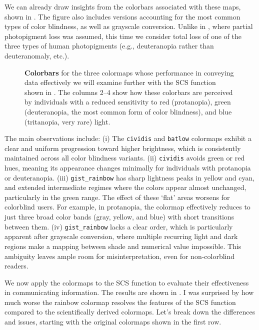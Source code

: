 We can already draw insights from the colorbars associated with these maps, shown in . The figure also includes versions accounting for the most common types of color blindness, as well as grayscale conversion. Unlike in , where partial photopigment loss was assumed, this time we consider total loss of one of the three types of human photopigments (e.g., deuteranopia rather than deuteranomaly, etc.).

\begin{figure}
	\centering
	
	\caption{\textbf{Colorbars} for the three colormaps whose performance in conveying data effectively we will examine further with the SCS function shown in . The columns 2--4 show how these colorbars are perceived by individuals with a reduced sensitivity to red (protanopia), green (deuteranopia, the most common form of color blindness), and blue (tritanopia, very rare) light.}
	\label{fig:colorbars}
\end{figure}

The main observations include: (i) The \verb|cividis| and \verb|batlow| colormaps exhibit a clear and uniform progression toward higher brightness, which is consistently maintained across all color blindness variants. (ii) \verb|cividis| avoids green or red hues, meaning its appearance changes minimally for individuals with protanopia or deuteranopia. (iii) \verb|gist_rainbow| has sharp lightness peaks in yellow and cyan, and extended intermediate regimes where the colors appear almost unchanged, particularly in the green range. The effect of these `flat' areas worsens for colorblind users. For example, in protanopia, the colormap effectively reduces to just three broad color bands (gray, yellow, and blue) with 
short transitions between them. (iv) \verb|gist_rainbow| lacks a clear order, which is particularly apparent after grayscale conversion, where multiple recurring light and dark regions make a mapping between shade and numerical value impossible. This ambiguity leaves ample room for misinterpretation, even for non-colorblind readers.

We now apply the colormaps to the SCS function to evaluate their effectiveness in communicating information.
The results are shown in . I was surprised by how much worse the rainbow colormap resolves the features of the SCS function compared to the scientifically derived colormaps. Let's break down the differences and issues, starting with the original colormaps shown in the first row.

